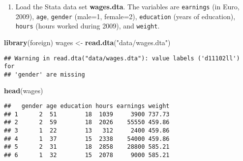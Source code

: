 \documentclass[]{article}
\newenvironment{Shaded}{\begin{snugshade}}{\end{snugshade}}
\newcommand{\KeywordTok}[1]{\textcolor[rgb]{0.13,0.29,0.53}{\textbf{#1}}}
\newcommand{\StringTok}[1]{\textcolor[rgb]{0.31,0.60,0.02}{#1}}
\newcommand{\OperatorTok}[1]{\textcolor[rgb]{0.81,0.36,0.00}{\textbf{#1}}}
\newcommand{\NormalTok}[1]{#1}
\providecommand{\tightlist}{%
  \setlength{\itemsep}{0pt}\setlength{\parskip}{0pt}}
\begin{document}
\begin{enumerate}
\def\labelenumi{\arabic{enumi}.}
\tightlist
\item
  Load the Stata data set \textbf{wages.dta}. The variables are
  \texttt{earnings} (in Euro, 2009), \texttt{age}, \texttt{gender}
  (male=1, female=2), \texttt{education} (years of education),
  \texttt{hours} (hours worked during 2009), and \texttt{weight}.
\end{enumerate}

\begin{Shaded}
\begin{Highlighting}[]
\KeywordTok{library}\NormalTok{(foreign)}
\NormalTok{wages <-}\StringTok{ }\KeywordTok{read.dta}\NormalTok{(}\StringTok{"data/wages.dta"}\NormalTok{)}
\end{Highlighting}
\end{Shaded}

\begin{verbatim}
## Warning in read.dta("data/wages.dta"): value labels ('d11102ll') for
## 'gender' are missing
\end{verbatim}

\begin{Shaded}
\begin{Highlighting}[]
\KeywordTok{head}\NormalTok{(wages)}
\end{Highlighting}
\end{Shaded}

\begin{verbatim}
##   gender age education hours earnings weight
## 1      2  51        18  1039     3900 737.73
## 2      2  59        18  2026    55550 459.86
## 3      1  22        13   312     2400 459.86
## 4      1  37        15  2338    54000 459.86
## 5      2  31        18  2858    28800 585.21
## 6      1  32        15  2078     9000 585.21
\end{verbatim}

\begin{Shaded}
\end{Shaded}
\end{document}
